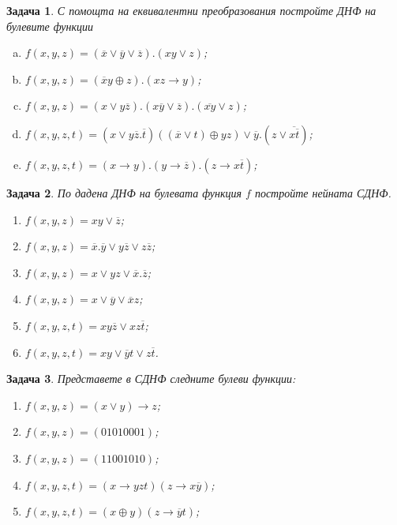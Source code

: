\documentclass[a4paper]{article}
\newtheorem{problem}{Задача}
\newcommand{\ov}[1]{\overline{#1}}
\begin{document}
\begin{problem} %
  С помощта на еквивалентни преобразования постройте ДНФ на булевите функции
  \begin{enumerate}[a)]
  \item
    $f(x,y,z) = (\ov{x}\vee\ov{y}\vee\ov{z}).(xy\vee z)$;
  \item
    $f(x,y,z) = (\overline{x}y\oplus z).(xz\rightarrow y)$;
  \item
    $f(x,y,z) = (x\vee y\overline{z}).(x\ov{y}\vee\ov{z}).(\ov{xy}\vee z)$;
  \item
    $f(x,y,z,t) = (x\vee y\ov{z}.\ov{t})((\ov{x}\vee t)\oplus yz)\vee \ov{y}.(z\vee \ov{x\ov{t}})$;
  \item
    $f(x,y,z,t) = (x\rightarrow y).(y\rightarrow \ov{z}).(z\rightarrow x\ov{t})$;
  \end{enumerate}
\end{problem}

\begin{problem}%
  По дадена ДНФ на булевата функция $f$ постройте нейната СДНФ.
  \begin{enumerate}[1)]
  \item
    $f(x,y,z) = xy\vee\ov{z}$;
  \item
    $f(x,y,z) = \ov{x}.\ov{y} \vee y\ov{z} \vee z\ov{z}$;
  \item
    $f(x,y,z) = x\vee yz \vee \ov{x}.\ov{z}$;
  \item
    $f(x,y,z) = x\vee \ov{y}\vee \ov{x}z$;
  \item
    $f(x,y,z,t) = xy\ov{z} \vee xz\ov{t}$;
  \item
    $f(x,y,z,t) = xy \vee \ov{y}t \vee z\ov{t}$.
  \end{enumerate}
\end{problem}


\begin{problem}
  Представете в СДНФ следните булеви функции:
  \begin{enumerate}[1)]
  \item
    $f(x,y,z) = (x\vee y)\rightarrow z$;
  \item
    $f(x,y,z) = (01010001)$;
  \item
    $f(x,y,z) = (11001010)$;
  \item
    $f(x,y,z,t) = (x\rightarrow yzt)(z\rightarrow x\ov{y})$;
  \item
    $f(x,y,z,t) = (x\oplus y)(z\rightarrow \ov{y}t)$;
  \end{enumerate}
\end{problem}
\end{document}
